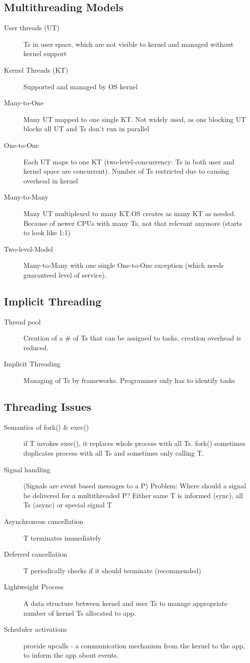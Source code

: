 \subsection*{Multithreading Models}
\begin{description}
  \item[User threads (UT)] Ts in user space, which are not visible to kernel and managed without kernel support
  \item[Kernel Threads (KT)] Supported and managed by OS kernel
  \item[Many-to-One] Many UT mapped to one single KT. Not widely used, as one blocking UT blocks all UT and Ts don't run in parallel
  \item[One-to-One] Each UT maps to one KT (two-level-concurrency: Ts in both user and kernel space are concurrent). Number of Ts restricted due to causing overhead in kernel
  \item[Many-to-Many] Many UT multiplexed to many KT.OS creates as many KT as needed. Because of newer CPUs with many Ts, not that relevant anymore (starts to look like 1:1)
  \item[Two-level-Model] Many-to-Many with one single One-to-One exception (which needs guaranteed level of service).
\end{description}

\subsection*{Implicit Threading}
\begin{description}
  \item[Thread pool] Creation of a # of Ts that can be assigned to tasks, creation overhead is reduced.
  \item[Implicit Threading] Managing of Ts by frameworks. Programmer only has to identify tasks
\end{description}

\subsection*{Threading Issues}
\begin{description}
\item[Semantics of fork() \& exec()] if T invokes exec(), it replaces whole process with all Ts. fork() sometimes duplicates process with all Ts and sometimes only calling T.
  \item[Signal handling] (Signals are event based messages to a P) Problem: Where should a signal be delivered for a multithreaded P? Either same T is informed (sync), all Ts (async) or special signal T
  \item[Asynchronous cancellation] T terminates immediately
  \item[Deferred cancellation] T periodically checks if it should terminate (recommended)
  \item[Lightweight Process] A data structure between kernel and user Ts to manage appropriate number of kernel Ts allocated to app.
  \item[Scheduler activations] provide upcalls - a communication mechanism from the kernel to the app, to inform the app about events.
\end{description}
